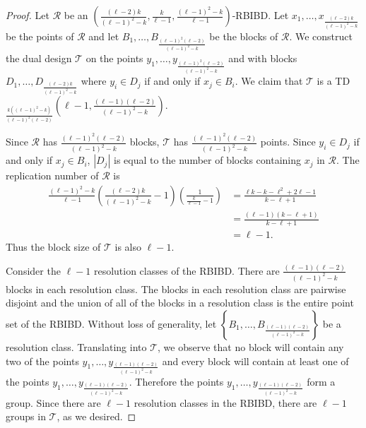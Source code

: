 \documentclass[12pt]{article}
\theoremstyle{definition}
\begin{document}
\begin{proof}
    Let $\mathcal{R}$ be an $\left(\frac{(\ell-2)k}{(\ell-1)^2 - k}, \frac{k}{\ell-1}, \frac{(\ell-1)^2 - k}{\ell-1}\right)$-RBIBD. Let $x_1, \dots, x_{\frac{(\ell-2)k}{(\ell-1)^2 - k}}$ be the points of $\mathcal{R}$ and let $B_1, \dots, B_{\frac{(\ell-1)^2(\ell-2)}{(\ell-1)^2 - k}}$ be the blocks of $\mathcal{R}$. We construct the dual design $\mathcal{T}$ on the points $y_1, \dots, y_{\frac{(\ell-1)^2(\ell-2)}{(\ell-1)^2 - k}}$ and with blocks $D_1, \dots, D_{\frac{(\ell-2)k}{(\ell-1)^2 - k}}$ where $y_i \in D_j$ if and only if $x_j \in B_i$. We claim that $\mathcal{T}$ is a TD$_{\frac{k((\ell-1)^2 - k)}{(\ell-1)^2(\ell-2)}}\left(\ell-1, \frac{(\ell-1)(\ell-2)}{(\ell-1)^2 - k}\right)$. 

    Since $\mathcal{R}$ has $\frac{(\ell-1)^2(\ell-2)}{(\ell-1)^2 - k}$ blocks, $\mathcal{T}$ has $\frac{(\ell-1)^2(\ell-2)}{(\ell-1)^2 - k}$ points. Since $y_i \in D_j$ if and only if $x_j \in B_i$, $|D_j|$ is equal to the number of blocks containing $x_j$ in $\mathcal{R}$. The replication number of $\mathcal{R}$ is 
    \begin{align*}
        \frac{(\ell-1)^2 - k}{\ell-1} \left( \frac{(\ell-2)k}{(\ell-1)^2 - k} - 1 \right)\left( \frac{1}{\frac{k}{\ell-1} - 1} \right) &= \frac{\ell k - k - \ell^2 + 2\ell - 1}{k - \ell + 1} \\
        &= \frac{(\ell-1)(k-\ell+1)}{k-\ell+1} \\
        &=\ell-1.
    \end{align*}
    Thus the block size of $\mathcal{T}$ is also $\ell - 1$. 

    Consider the $\ell-1$ resolution classes of the RBIBD. There are $\frac{(\ell-1)(\ell-2)}{(\ell-1)^2 - k}$ blocks in each resolution class. The blocks in each resolution class are pairwise disjoint and the union of all of the blocks in a resolution class is the entire point set of the RBIBD. Without loss of generality, let $\left\{B_1, \dots, B_{\frac{(\ell-1)(\ell-2)}{(\ell-1)^2 - k}}\right\}$ be a resolution class. Translating into $\mathcal{T}$, we observe that no block will contain any two of the points $y_1, \dots, y_{\frac{(\ell-1)(\ell-2)}{(\ell-1)^2 - k}}$ and every block will contain at least one of the points $y_1, \dots, y_{\frac{(\ell-1)(\ell-2)}{(\ell-1)^2 - k}}$. Therefore the points $y_1, \dots, y_{\frac{(\ell-1)(\ell-2)}{(\ell-1)^2 - k}}$ form a group. Since there are $\ell-1$ resolution classes in the RBIBD, there are $\ell-1$ groups in $\mathcal{T}$, as we desired.


\end{proof}
\end{document}
